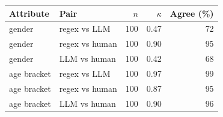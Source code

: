 \begin{tabular}{llrrr}
\toprule
Attribute & Pair & $n$ & $\kappa$ & Agree (\%) \\
\midrule
gender & regex vs LLM & 100 & 0.47 & 72 \\
gender & regex vs human & 100 & 0.90 & 95 \\
gender & LLM vs human & 100 & 0.42 & 68 \\
age bracket & regex vs LLM & 100 & 0.97 & 99 \\
age bracket & regex vs human & 100 & 0.87 & 95 \\
age bracket & LLM vs human & 100 & 0.90 & 96 \\
\bottomrule
\end{tabular}

